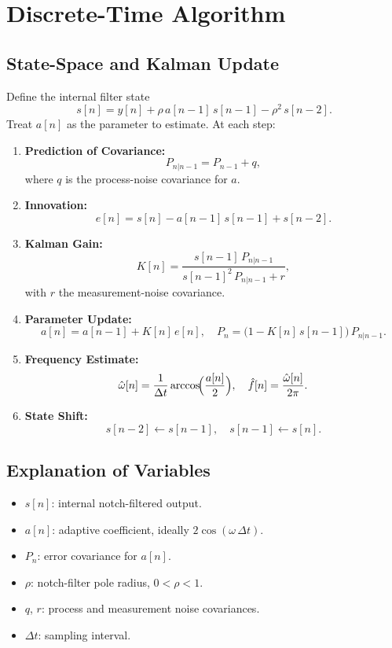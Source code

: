 \documentclass{article}
\begin{document}
\section{Discrete-Time Algorithm}

\subsection{State-Space and Kalman Update}
Define the internal filter state
\[
s[n] = y[n] + \rho\,a[n-1]\,s[n-1] - \rho^2\,s[n-2].
\]
Treat \(a[n]\) as the parameter to estimate.  At each step:

\begin{enumerate}
  \item \textbf{Prediction of Covariance:}
    \[
      P_{n|n-1} = P_{n-1} + q,
    \]
    where \(q\) is the process-noise covariance for \(a\).
  \item \textbf{Innovation:}
    \[
      e[n] = s[n] - a[n-1]\,s[n-1] + s[n-2].
    \]
  \item \textbf{Kalman Gain:}
    \[
      K[n] = \frac{s[n-1]\,P_{n|n-1}}{s[n-1]^2\,P_{n|n-1} + r},
    \]
    with \(r\) the measurement-noise covariance.
  \item \textbf{Parameter Update:}
    \[
      a[n] = a[n-1] + K[n]\,e[n],
      \quad
      P_n = \bigl(1 - K[n]\,s[n-1]\bigr)\,P_{n|n-1}.
    \]
  \item \textbf{Frequency Estimate:}
    \[
      \hat\omega[n]
      = \frac{1}{\Delta t}\arccos\!\Bigl(\frac{a[n]}{2}\Bigr),
      \quad
      \hat f[n] = \frac{\hat\omega[n]}{2\pi}.
    \]
  \item \textbf{State Shift:}
    \[
      s[n-2]\gets s[n-1], 
      \quad 
      s[n-1]\gets s[n].
    \]
\end{enumerate}

\subsection{Explanation of Variables}
\begin{itemize}
  \item \(s[n]\): internal notch-filtered output.  
  \item \(a[n]\): adaptive coefficient, ideally \(2\cos(\omega\,\Delta t)\).  
  \item \(P_n\): error covariance for \(a[n]\).  
  \item \(\rho\): notch-filter pole radius, \(0<\rho<1\).  
  \item \(q\), \(r\): process and measurement noise covariances.  
  \item \(\Delta t\): sampling interval.  
\end{itemize}
\end{document}
